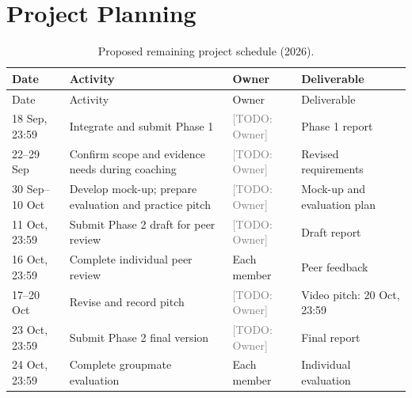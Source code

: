 \documentclass[11pt,a4paper]{article}
\newcommand{\placeholder}[1]{\textcolor{gray}{[TODO: #1]}}
\begin{document}
\clearpage
\section{Project Planning}

\begin{longtable}{@{}p{}p{}p{}p{}@{}}
\caption{Proposed remaining project schedule (2026).}\\
\toprule
Date & Activity & Owner & Deliverable \\
\midrule
\endfirsthead
\toprule
Date & Activity & Owner & Deliverable \\
\midrule
\endhead
18 Sep, 23:59 & Integrate and submit Phase 1 & \placeholder{Owner} & Phase 1 report \\
22--29 Sep & Confirm scope and evidence needs during coaching & \placeholder{Owner} & Revised requirements \\
30 Sep--10 Oct & Develop mock-up; prepare evaluation and practice pitch & \placeholder{Owner} & Mock-up and evaluation plan \\
11 Oct, 23:59 & Submit Phase 2 draft for peer review & \placeholder{Owner} & Draft report \\
16 Oct, 23:59 & Complete individual peer review & Each member & Peer feedback \\
17--20 Oct & Revise and record pitch & \placeholder{Owner} & Video pitch: 20 Oct, 23:59 \\
23 Oct, 23:59 & Submit Phase 2 final version & \placeholder{Owner} & Final report \\
24 Oct, 23:59 & Complete groupmate evaluation & Each member & Individual evaluation \\
\bottomrule
\end{longtable}
\end{document}
